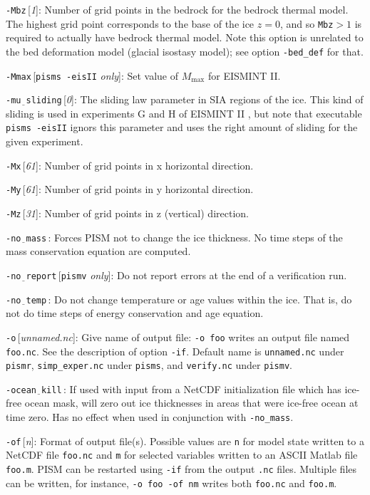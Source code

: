 \documentclass[11pt,final]{amsart}
\renewcommand{\t}[1]{\texttt{#1}}
\newcommand{\rawopt}[1]{\vspace{1mm}\noindent \large\texttt{-#1}\normalsize}
\newcommand{\opt}[1]{\rawopt{#1}\,:\quad}
\newcommand{\optdef}[2]{\rawopt{#1}\,[\textsl{#2}]:\quad}
\newcommand{\optrestrict}[2]{\rawopt{#1}\,[\texttt{#2} \textsl{only}]:\quad}
\newcommand{\und}{$\underline{\,\,\,}$}
\begin{document}
\optdef{Mbz}{1}  Number of grid points in the bedrock for the bedrock thermal model.  The highest grid point corresponds to the base of the ice $z=0$, and so \t{Mbz}$>1$ is required to actually have bedrock thermal model.  Note this option is unrelated to the bed deformation model (glacial isostasy model); see option \verb|-bed_def| for that.

\optrestrict{Mmax}{pisms -eisII}  Set value of $M_{\text{max}}$ for EISMINT II.

\optdef{mu\und sliding}{0}  The sliding law parameter in SIA regions of the ice.  This kind of sliding is used in experiments G and H of EISMINT II \cite{EISMINT00}, but note that executable \verb|pisms -eisII| ignors this parameter and uses the right amount of sliding for the given experiment.

\optdef{Mx}{61}  Number of grid points in x horizontal direction.

\optdef{My}{61}  Number of grid points in y horizontal direction.

\optdef{Mz}{31}  Number of grid points in z (vertical) direction.

\opt{no\und mass}  Forces PISM not to change the ice thickness.  No time steps of the mass conservation equation are computed.

\optrestrict{no\und report}{pismv}  Do not report errors at the end of a verification run.

\opt{no\und temp}  Do not change temperature or age values within the ice.  That is, do not do time steps of energy conservation and age equation.

\optdef{o}{unnamed.nc} Give name of output file: \verb|-o foo| writes an output file named \verb|foo.nc|.  See the description of option \verb|-if|.  Default name is \verb|unnamed.nc| under \verb|pismr|, \verb|simp_exper.nc| under \verb|pisms|, and \verb|verify.nc| under \verb|pismv|.

\opt{ocean\und kill}  If used with input from a NetCDF initialization file which has ice-free ocean mask, will zero out ice thicknesses in areas that were ice-free ocean at time zero.  Has no effect when used in conjunction with \verb|-no_mass|.

\optdef{of}{n}  Format of output file(s).  Possible values are \verb|n| for model state written to a NetCDF file \verb|foo.nc| and \verb|m| for selected variables written to an ASCII Matlab file \verb|foo.m|.  PISM can be restarted using \verb|-if| from the output \verb|.nc| files.  Multiple files can be written, for instance, \verb|-o foo -of nm| writes both \verb|foo.nc| and \verb|foo.m|.
\end{document}
